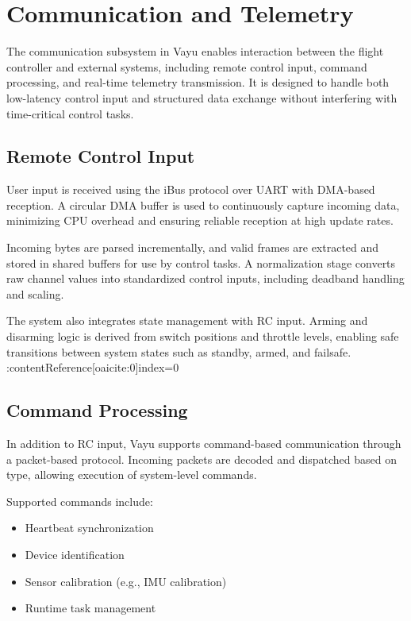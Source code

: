 \section{Communication and Telemetry}
\label{sec:vayu_telemetry}

The communication subsystem in Vayu enables interaction between the flight controller and external systems, including remote control input, command processing, and real-time telemetry transmission. It is designed to handle both low-latency control input and structured data exchange without interfering with time-critical control tasks.

\subsection{Remote Control Input}

User input is received using the iBus protocol over UART with DMA-based reception. A circular DMA buffer is used to continuously capture incoming data, minimizing CPU overhead and ensuring reliable reception at high update rates.

Incoming bytes are parsed incrementally, and valid frames are extracted and stored in shared buffers for use by control tasks. A normalization stage converts raw channel values into standardized control inputs, including deadband handling and scaling.

The system also integrates state management with RC input. Arming and disarming logic is derived from switch positions and throttle levels, enabling safe transitions between system states such as standby, armed, and failsafe. :contentReference[oaicite:0]{index=0}

\subsection{Command Processing}

In addition to RC input, Vayu supports command-based communication through a packet-based protocol. Incoming packets are decoded and dispatched based on type, allowing execution of system-level commands.

Supported commands include:
\begin{itemize}
    \item Heartbeat synchronization
    \item Device identification
    \item Sensor calibration (e.g., IMU calibration)
    \item Runtime task management
\end{itemize}

